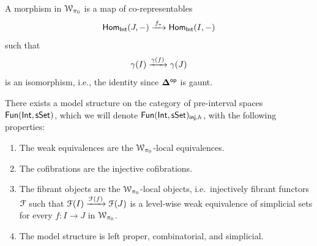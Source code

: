\begin{observation}
    A morphism in $\mathcal W_{\pi_0}$ is a map of co-representables
    \begin{equation}
        \operatorname{\sf Hom}_{\operatorname{\mathsf{Int}}}(J,-) \xrightarrow{\,f_*\,} \operatorname{\sf Hom}_{\operatorname{\mathsf{Int}}}(I,-)
    \end{equation}
    such that 
    \[
      \gamma(I) \xrightarrow{\gamma(f)} \gamma(J)
    \]
    is an isomorphism, i.e., the identity since $\mathbf\Delta^{\mathsf{op}}$ is gaunt.
\end{observation}

\begin{proposition}\label{ch2:: prop: model structure interval}
    There exists a model structure on the category of pre-interval spaces $\operatorname{\sf Fun}(\operatorname{\mathsf{Int}},\operatorname{\sf sSet})$, which we will denote $\operatorname{\sf Fun}(\operatorname{\mathsf{Int}},\operatorname{\sf sSet})_{\mathsf{inj},h}$, with the following properties:
    \begin{enumerate}
        \item The weak equivalences are the $\mathcal W_{\pi_0}$-local equivalences.
        \item The cofibrations are the injective cofibrations.
        \item The fibrant objects are the $\mathcal W_{\pi_0}$-local objects, i.e.\ injectively fibrant functors $\mathcal F$ such that $\mathcal F(I) \xrightarrow{\mathcal F(f)} \mathcal F(J)$ is a level-wise weak equivalence of simplicial sets for every $f\colon I \to J$ in $\mathcal W_{\pi_0}$.
        \item The model structure is left proper, combinatorial, and simplicial.
    \end{enumerate} 
\end{proposition}

